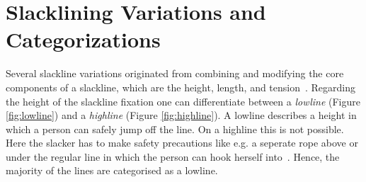 \section{Slacklining Variations and Categorizations}\label{3_2_slacklineVariations}
Several slackline variations originated from combining and modifying the core components of a slackline, which are the height, length, and tension~\cite{Kleindl2011-bl, MillerMauser2013-sl, Thomann2017-ab}.
Regarding the height of the slackline fixation one can differentiate between a \textit{lowline} (Figure \ref{fig:lowline}) and a \textit{highline} (Figure \ref{fig:highline}).
A lowline describes a height in which a person can safely jump off the line.
On a highline this is not possible.
Here the slacker has to make safety precautions like e.g. a seperate rope above or under the regular line in which the person can hook herself into~\cite{Kleindl2011-bl}. Hence, the majority of the lines are categorised as a lowline.
